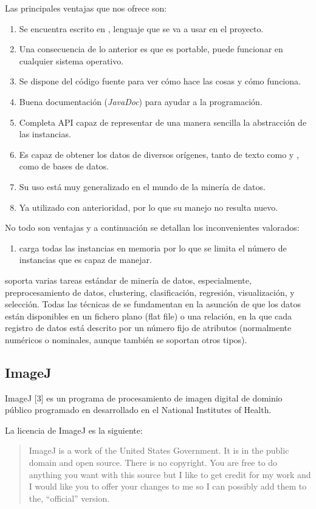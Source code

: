 Las principales ventajas que nos ofrece son:
\begin{enumerate}
 \item Se encuentra escrito en \java{}, lenguaje que se va a usar en el proyecto.
 \item Una consecuencia de lo anterior es que \weka{} es portable, puede funcionar en cualquier sistema operativo.
 \item Se dispone del código fuente para ver cómo hace las cosas y cómo funciona.
 \item Buena documentación (\textit{JavaDoc}) para ayudar a la programación.
 \item Completa API capaz de representar de una manera sencilla la abstracción de las instancias.
 \item Es capaz de obtener los datos de diversos orígenes, tanto de texto como \arff{} y \csv{}, como de bases de datos.
 \item Su uso está muy generalizado en el mundo de la minería de datos.
 \item Ya utilizado con anterioridad, por lo que su manejo no resulta nuevo.
\end{enumerate}
No todo son ventajas y a continuación se detallan los inconvenientes valorados:
\begin{enumerate}
 \item \weka{} carga todas las instancias en memoria por lo que se limita el número de instancias que es capaz de manejar.
\end{enumerate}

\weka{} soporta varias tareas estándar de minería de datos, especialmente, preprocesamiento de
datos, clustering, clasificación, regresión, visualización, y selección. Todas las técnicas de \weka{} se fundamentan en la asunción de que los datos están disponibles en un fichero plano (flat file) o una relación, en la que cada registro de datos está descrito por un número fijo de atributos (normalmente numéricos o nominales, aunque también se soportan otros tipos).


\subsection{ImageJ}
ImageJ [3] es un programa de procesamiento de imagen digital de dominio público programado en \java{} desarrollado en el National Institutes of Health.

La licencia de ImageJ es la siguiente:

\begin{quotation}
ImageJ is a work of the United States Government. It is in the public domain and
open source. There is no copyright. You are free to do anything you want with this
source but I like to get credit for my work and I would like you to offer your changes
to me so I can possibly add them to the, “official” version.
\end{quotation}

